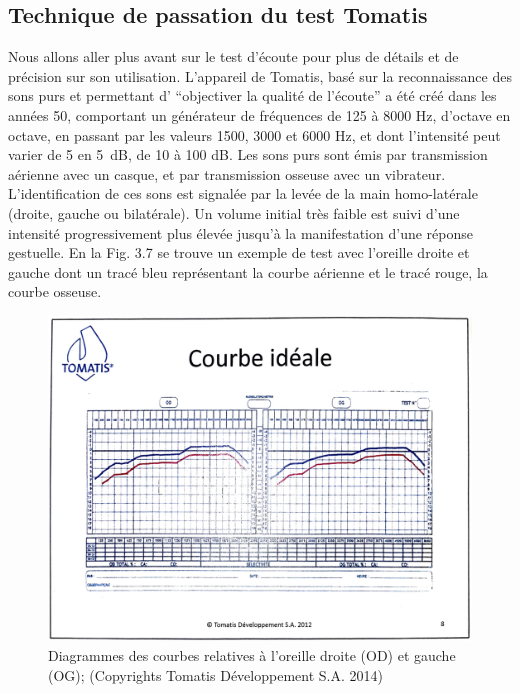 \subsection{Technique de passation du test Tomatis\textsuperscript \textregistered }
Nous allons aller plus avant sur le test d'écoute pour plus de détails et de précision sur son utilisation.
L'appareil de Tomatis, basé sur la reconnaissance des sons purs 
et permettant d'
\enquote{objectiver la qualité de l'écoute} \autocite [34--35]{Tomatislangage}
 a été créé dans les années 50, comportant un générateur de fréquences
  de 125 à 8000 Hz, d'octave en octave, en passant par les valeurs
1500, 3000 et 6000 Hz, et dont l'intensité peut varier de 5 en \SI{5}{\dB}, de 10 à 100 dB.
Les sons purs sont émis par 
  transmission aérienne avec un casque, et par transmission osseuse
  avec un vibrateur.
L'identification de ces sons est
  signalée par la levée de la main homo-latérale (droite, gauche ou
  bilatérale).
Un volume initial très faible est suivi d'une intensité
progressivement plus élevée jusqu'à la manifestation d'une réponse gestuelle.
En la Fig. 3.7 se trouve un exemple de test avec l'oreille droite et gauche dont un tracé bleu représentant 
la courbe aérienne et le tracé rouge, la courbe osseuse.



\begin{figure}
	\centering
	\includegraphics[width=0.7
	\linewidth]{images/graphiques/courbeideale.png}
	\caption[Courbe idéale]{Diagrammes des courbes relatives à l'oreille droite (OD) et
          gauche (OG); (Copyrights Tomatis Développement S.A.  2014) }
	\label{Courbe idéale}
\end{figure}


